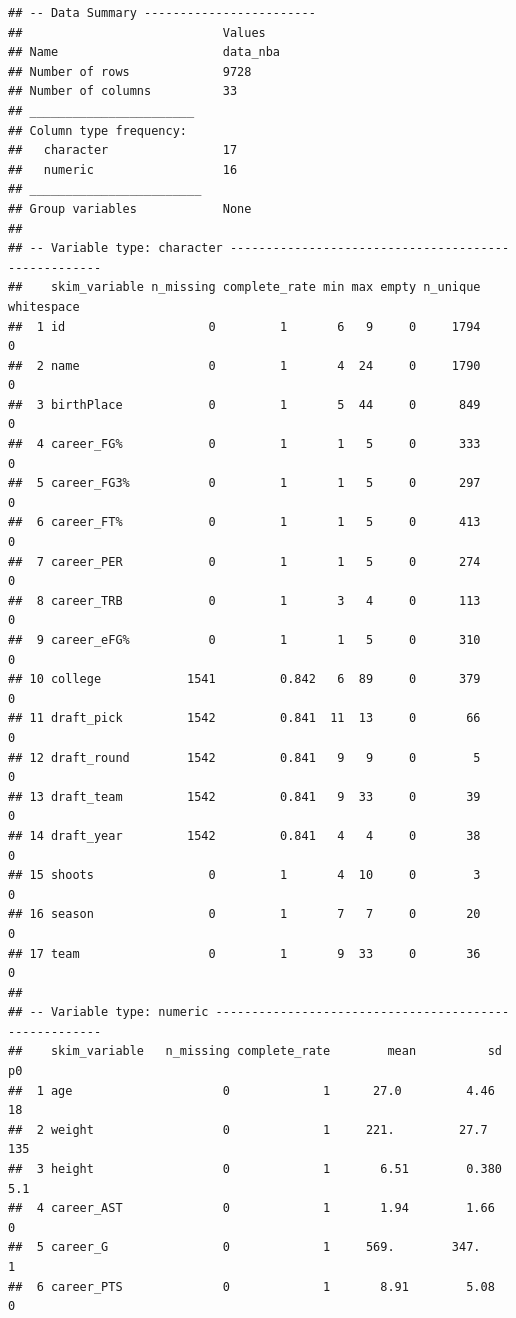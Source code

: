 \documentclass[
]{book}
\begin{document}
\begin{verbatim}
## -- Data Summary ------------------------
##                            Values  
## Name                       data_nba
## Number of rows             9728    
## Number of columns          33      
## _______________________            
## Column type frequency:             
##   character                17      
##   numeric                  16      
## ________________________           
## Group variables            None    
## 
## -- Variable type: character ----------------------------------------------------
##    skim_variable n_missing complete_rate min max empty n_unique whitespace
##  1 id                    0         1       6   9     0     1794          0
##  2 name                  0         1       4  24     0     1790          0
##  3 birthPlace            0         1       5  44     0      849          0
##  4 career_FG%            0         1       1   5     0      333          0
##  5 career_FG3%           0         1       1   5     0      297          0
##  6 career_FT%            0         1       1   5     0      413          0
##  7 career_PER            0         1       1   5     0      274          0
##  8 career_TRB            0         1       3   4     0      113          0
##  9 career_eFG%           0         1       1   5     0      310          0
## 10 college            1541         0.842   6  89     0      379          0
## 11 draft_pick         1542         0.841  11  13     0       66          0
## 12 draft_round        1542         0.841   9   9     0        5          0
## 13 draft_team         1542         0.841   9  33     0       39          0
## 14 draft_year         1542         0.841   4   4     0       38          0
## 15 shoots                0         1       4  10     0        3          0
## 16 season                0         1       7   7     0       20          0
## 17 team                  0         1       9  33     0       36          0
## 
## -- Variable type: numeric ------------------------------------------------------
##    skim_variable   n_missing complete_rate        mean          sd     p0
##  1 age                     0             1      27.0         4.46    18  
##  2 weight                  0             1     221.         27.7    135  
##  3 height                  0             1       6.51        0.380    5.1
##  4 career_AST              0             1       1.94        1.66     0  
##  5 career_G                0             1     569.        347.       1  
##  6 career_PTS              0             1       8.91        5.08     0  

\end{verbatim}
\end{document}
